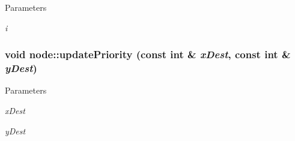 \begin{DoxyParams}{Parameters}
\item[{\em i}]\end{DoxyParams}
\hypertarget{classnode_ad51b92de008bd5107a7b55cc61fc497b}{
\subsubsection[{updatePriority}]{\setlength{\rightskip}{0pt plus 5cm}void node::updatePriority (const int \& {\em xDest}, \/  const int \& {\em yDest})}}
\label{classnode_ad51b92de008bd5107a7b55cc61fc497b}

\begin{DoxyParams}{Parameters}
\item[{\em xDest}]\item[{\em yDest}]\end{DoxyParams}


